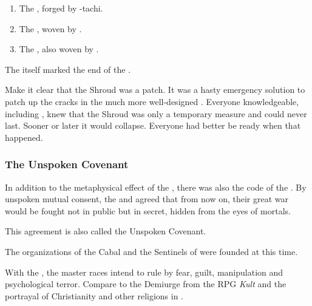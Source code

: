 \begin{enumerate}
  \item The , forged by \Tiamat-tachi.
  \item The , woven by \Daggerrain. 
  \item The , also woven by \Daggerrain. 
\end{enumerate}

The  itself marked the end of the \secondbanewar. 

Make it clear that the Shroud was a patch. 
It was a hasty emergency solution to patch up the cracks in the much more well-designed \CrystalSphere. 
Everyone knowledgeable, including \Ishnaruchaefir, knew that the Shroud was only a temporary measure and could never last. 
Sooner or later it would collapse.
Everyone had better be ready when that happened. 








\subsubsection{The Unspoken Covenant}
In addition to the metaphysical effect of the \SecondShrouding{}, there was also the code of the \charade. By unspoken mutual consent, the \dragons{} and \banes{} agreed that from now on, their great war would be fought not in public but in secret, hidden from the eyes of mortals. 

This agreement is also called the Unspoken Covenant. 

The organizations of the Cabal and the Sentinels of \Miith{} were founded at this time.

With the \charade, the master races intend to rule by fear, guilt, manipulation and psychological terror. Compare to the Demiurge from the RPG \emph{Kult} and the portrayal of Christianity and other religions in \DIBiggestSecret. 


